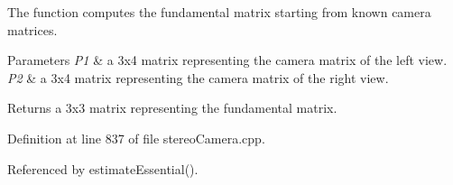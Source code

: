 The function computes the fundamental matrix starting from known camera matrices. 


\begin{DoxyParams}{Parameters}
{\em P1} & a 3x4 matrix representing the camera matrix of the left view. \\
\hline
{\em P2} & a 3x4 matrix representing the camera matrix of the right view. \\
\hline
\end{DoxyParams}
\begin{DoxyReturn}{Returns}
a 3x3 matrix representing the fundamental matrix. 
\end{DoxyReturn}


Definition at line 837 of file stereo\+Camera.\+cpp.



Referenced by estimate\+Essential().


